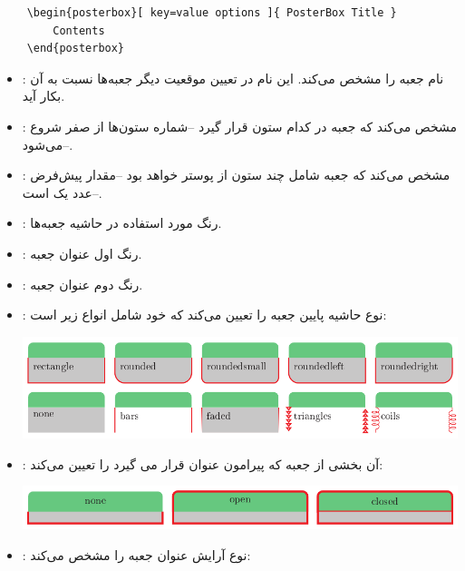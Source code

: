 \documentclass[debug,a0paper,persian]{xebaposter}
\begin{document}
\begin{poster}
\begin{posterbox}[name=posterboxoption,column=1,span=2,below=posteroption,textborder=none
,headershape=rectangle,headerborder=none,textborder=coils]
\begin{latin}
\vspace{-3mm}
\begin{verbatim}
    \begin{posterbox}[ key=value options ]{ PosterBox Title }
        Contents
    \end{posterbox}
\end{verbatim}
\end{latin}
\begin{itemize}
    \item {}: نام جعبه را مشخص می‌کند. این نام در تعیین موقعیت دیگر جعبه‌ها نسبت به آن بکار آید.
    \item {}: مشخص می‌کند که جعبه در کدام ستون قرار گیرد 
    --شماره ستون‌ها از صفر شروع می‌شود--.
    \item {}:    
    مشخص می‌کند که جعبه شامل چند ستون از پوستر خواهد بود --مقدار پیش‌فرض عدد یک است--. 
    \item {}:
    رنگ مورد استفاده در حاشیه جعبه‌ها. 
    \item {}:
    رنگ اول عنوان جعبه.
    \item {}:
    رنگ دوم عنوان جعبه.
    \item {}:
    نوع حاشیه پایین جعبه را تعیین می‌کند که خود شامل انواع زیر است:
    
    \centerline{\includegraphics[scale=0.7]{docs-boxshape}}
    \item {}:
    آن بخشی از جعبه که پیرامون عنوان قرار می گیرد را تعیین می‌کند:
    
    \centerline{\includegraphics[scale=0.7]{docs-headerborder}}
    \item {}:
    نوع آرایش عنوان جعبه را مشخص می‌کند:
    

\end{itemize}
\end{posterbox}
\end{poster}
\end{document}
